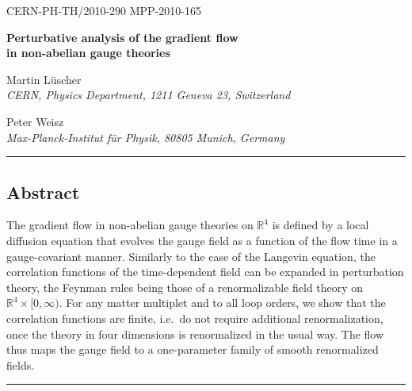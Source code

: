 \documentclass[11pt]{article}
\numberwithin{equation}{section}
\newcommand{\rz}{\mathbb{R}}
\begin{document}
\begin{center}
{\small CERN-PH-TH/2010-290 \quad MPP-2010-165}

\vspace{1.0cm}
{\LARGE\bfseries Perturbative analysis of the gradient flow\\[0.35cm]
in non-abelian gauge theories\par}

\vspace{0.9cm}
{\large Martin L\"uscher}\\[3pt]
{\itshape CERN, Physics Department, 1211 Geneva 23, Switzerland}

\vspace{0.45cm}
{\large Peter Weisz}\\[3pt]
{\itshape Max-Planck-Institut f\"ur Physik, 80805 Munich, Germany}
\end{center}

\vspace{0.4cm}

\vspace{0.35cm}
\noindent\rule{\textwidth}{0.4pt}
\vspace{-0.55cm}
\subsection*{Abstract}
The gradient flow in non-abelian gauge theories
on $\rz^4$
is defined by a local diffusion equation that evolves
the gauge field as a function of the flow time
in a gauge-covariant manner.
Similarly to the case of the Langevin equation,
the correlation functions of the time-dependent field
can be expanded in perturbation theory,
the Feynman rules being those of a
renormalizable field theory on $\rz^4\times[0,\infty)$.
For any matter multiplet and to all loop orders,
we show that the correlation functions are finite, i.e.~do not require
additional renormalization,
once the theory in four dimensions
is renormalized in the usual way.
The flow thus maps the gauge field to
a one-parameter family of smooth renormalized fields.

\vspace{-0.25cm}
\noindent\rule{\textwidth}{0.4pt}











\end{document}

